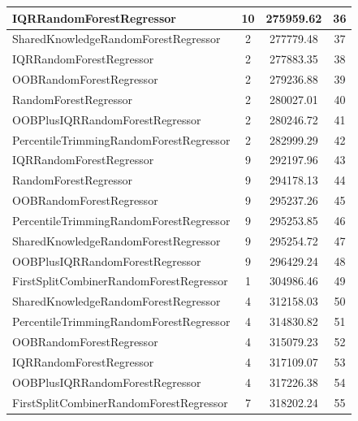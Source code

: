 \begin{table}[h]
\centering
\begin{tabular}{|l|c|c|c|}
\hline
\textcolor[HTML]{27aeef}{IQRRandomForestRegressor} & 10 & 275959.62 & 36 \\ \hline
\textcolor[HTML]{ef9b20}{SharedKnowledgeRandomForestRegressor} & 2 & 277779.48 & 37 \\ \hline
\textcolor[HTML]{27aeef}{IQRRandomForestRegressor} & 2 & 277883.35 & 38 \\ \hline
\textcolor[HTML]{b33dc6}{OOBRandomForestRegressor} & 2 & 279236.88 & 39 \\ \hline
\textcolor[HTML]{87bc45}{RandomForestRegressor} & 2 & 280027.01 & 40 \\ \hline
\textcolor[HTML]{ede15b}{OOBPlusIQRRandomForestRegressor} & 2 & 280246.72 & 41 \\ \hline
\textcolor[HTML]{f46a9b}{PercentileTrimmingRandomForestRegressor} & 2 & 282999.29 & 42 \\ \hline
\textcolor[HTML]{27aeef}{IQRRandomForestRegressor} & 9 & 292197.96 & 43 \\ \hline
\textcolor[HTML]{87bc45}{RandomForestRegressor} & 9 & 294178.13 & 44 \\ \hline
\textcolor[HTML]{b33dc6}{OOBRandomForestRegressor} & 9 & 295237.26 & 45 \\ \hline
\textcolor[HTML]{f46a9b}{PercentileTrimmingRandomForestRegressor} & 9 & 295253.85 & 46 \\ \hline
\textcolor[HTML]{ef9b20}{SharedKnowledgeRandomForestRegressor} & 9 & 295254.72 & 47 \\ \hline
\textcolor[HTML]{ede15b}{OOBPlusIQRRandomForestRegressor} & 9 & 296429.24 & 48 \\ \hline
\textcolor[HTML]{ea5545}{FirstSplitCombinerRandomForestRegressor} & 1 & 304986.46 & 49 \\ \hline
\textcolor[HTML]{ef9b20}{SharedKnowledgeRandomForestRegressor} & 4 & 312158.03 & 50 \\ \hline
\textcolor[HTML]{f46a9b}{PercentileTrimmingRandomForestRegressor} & 4 & 314830.82 & 51 \\ \hline
\textcolor[HTML]{b33dc6}{OOBRandomForestRegressor} & 4 & 315079.23 & 52 \\ \hline
\textcolor[HTML]{27aeef}{IQRRandomForestRegressor} & 4 & 317109.07 & 53 \\ \hline
\textcolor[HTML]{ede15b}{OOBPlusIQRRandomForestRegressor} & 4 & 317226.38 & 54 \\ \hline
\textcolor[HTML]{ea5545}{FirstSplitCombinerRandomForestRegressor} & 7 & 318202.24 & 55 \\ \hline

\end{tabular}
\end{table}
